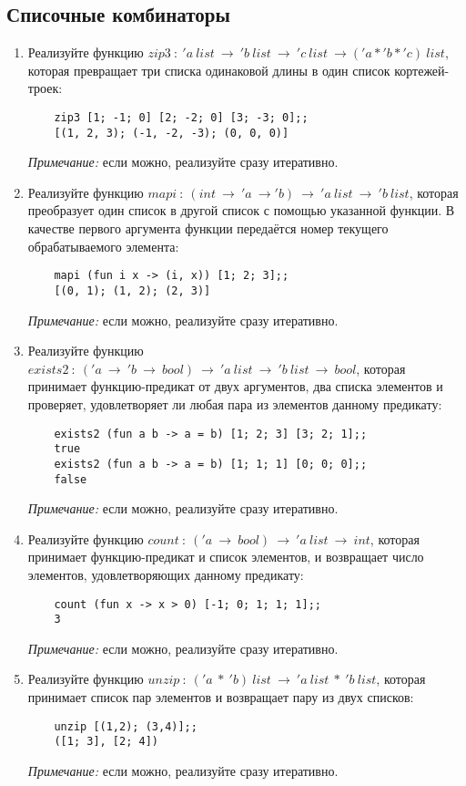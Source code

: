 \documentclass[a4paper,11pt]{article}
\begin{document}
\subsection*{Списочные комбинаторы}
\begin{enumerate}
\item Реализуйте функцию 
  $zip3~:~'\!a~list~\rightarrow~'\!b~list~\rightarrow~'\!c~list~\rightarrow
  ('\!a*'\!b*'\!c)~list$,
  которая превращает три списка одинаковой длины в один список кортежей-троек:
  \begin{lstlisting}
    zip3 [1; -1; 0] [2; -2; 0] [3; -3; 0];;
    [(1, 2, 3); (-1, -2, -3); (0, 0, 0)]
  \end{lstlisting}
  \emph{Примечание:} если можно, реализуйте сразу итеративно.

\item Реализуйте функцию $mapi~:~(int~\rightarrow~'\!a~\rightarrow
  '\!b)~\rightarrow~'\!a~list~\rightarrow~'\!b~list$, которая преобразует один
  список в другой список с помощью указанной функции. В качестве первого
  аргумента функции передаётся номер текущего обрабатываемого элемента:
  \begin{lstlisting}
    mapi (fun i x -> (i, x)) [1; 2; 3];;
    [(0, 1); (1, 2); (2, 3)]
  \end{lstlisting}
  \emph{Примечание:} если можно, реализуйте сразу итеративно.

\item Реализуйте функцию
  $exists2~:~('\!a~\rightarrow~'\!b~\rightarrow~bool)~\rightarrow~'\!a~list~
  \rightarrow~'\!b~list~\rightarrow~bool$,
  которая принимает функцию-предикат от двух аргументов, два списка элементов
  и проверяет, удовлетворяет ли любая пара из элементов данному предикату:
  \begin{lstlisting}
    exists2 (fun a b -> a = b) [1; 2; 3] [3; 2; 1];;
    true
    exists2 (fun a b -> a = b) [1; 1; 1] [0; 0; 0];;
    false
  \end{lstlisting}
  \emph{Примечание:} если можно, реализуйте сразу итеративно.

\item Реализуйте функцию $count~:~('\!a~\rightarrow~bool)~
  \rightarrow~'\!a~list~\rightarrow~int$, которая принимает функцию-предикат 
  и список элементов, и возвращает число элементов, удовлетворяющих данному
  предикату:
  \begin{lstlisting}
    count (fun x -> x > 0) [-1; 0; 1; 1; 1];;
    3
  \end{lstlisting}
  \emph{Примечание:} если можно, реализуйте сразу итеративно.

\item Реализуйте функцию $unzip~:~('\!a~*~'\!b)~list~\rightarrow~
  '\!a~list~*~'\!b~list$, которая принимает список пар элементов и возвращает
  пару из двух списков:
  \begin{lstlisting}
    unzip [(1,2); (3,4)];;
    ([1; 3], [2; 4])
  \end{lstlisting}
  \emph{Примечание:} если можно, реализуйте сразу итеративно.
\end{enumerate}
\end{document}
